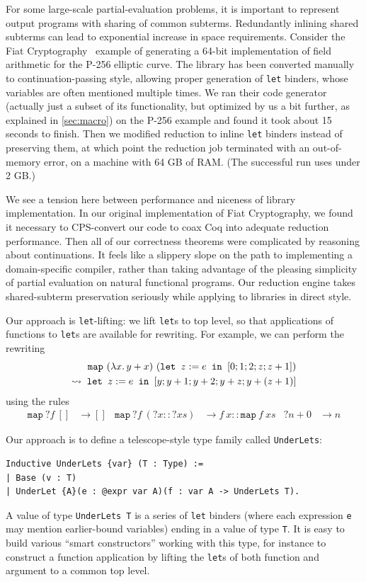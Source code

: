 For some large-scale partial-evaluation problems, it is important to represent output programs with sharing of common subterms.
Redundantly inlining shared subterms can lead to exponential increase in space requirements.
Consider the Fiat Cryptography~\cite{FiatCryptoSP19} example of generating a 64-bit implementation of field arithmetic for the P-256 elliptic curve.
The library has been converted manually to continuation-passing style, allowing proper generation of \texttt{let} binders, whose variables are often mentioned multiple times.
We ran their code generator (actually just a subset of its functionality, but optimized by us a bit further, as explained in \autoref{sec:macro}) on the P-256 example and found it took about 15 seconds to finish.
Then we modified reduction to inline \texttt{let} binders instead of preserving them, at which point the reduction job terminated with an out-of-memory error, on a machine with 64 GB of RAM.
(The successful run uses under 2 GB.)

We see a tension here between performance and niceness of library implementation.
In our original implementation of Fiat Cryptography, we found it necessary to CPS-convert our code to coax Coq into adequate reduction performance.
Then all of our correctness theorems were complicated by reasoning about continuations.
It feels like a slippery slope on the path to implementing a domain-specific compiler, rather than taking advantage of the pleasing simplicity of partial evaluation on natural functional programs.
Our reduction engine takes shared-subterm preservation seriously while applying to libraries in direct style.

Our approach is \texttt{let}-lifting: we lift \texttt{let}s to top level, so that applications of functions to \texttt{let}s are available for rewriting.
For example, we can perform the rewriting
\begin{align*}
  \texttt{map}\ (\lambda x.\, y+x)\ (\letin[{z:=e}{[0;1;2;z;z+1]}]) \\
  \leadsto \; \letin[{z:=e}{[y;y+1;y+2;y+z;y+(z+1)]}]
\end{align*}
using the rules
\begin{align*}
  \texttt{map}\ {?f}\ [] & \to []
  &
  \texttt{map}\ {?f}\ ({?x} :: {?xs}) & \to f\ x :: \texttt{map}\ f\ xs
  & {?n} + 0 & \to n %
\end{align*}

Our approach is to define a telescope-style type family called \texttt{UnderLets}:
\begin{verbatim}
Inductive UnderLets {var} (T : Type) :=
| Base (v : T)
| UnderLet {A}(e : @expr var A)(f : var A -> UnderLets T).
\end{verbatim}
A value of type \texttt{UnderLets T} is a series of \texttt{let} binders (where each expression \texttt{e} may mention earlier-bound variables) ending in a value of type \texttt{T}.
It is easy to build various ``smart constructors'' working with this type, for instance to construct a function application by lifting the \texttt{let}s of both function and argument to a common top level.

